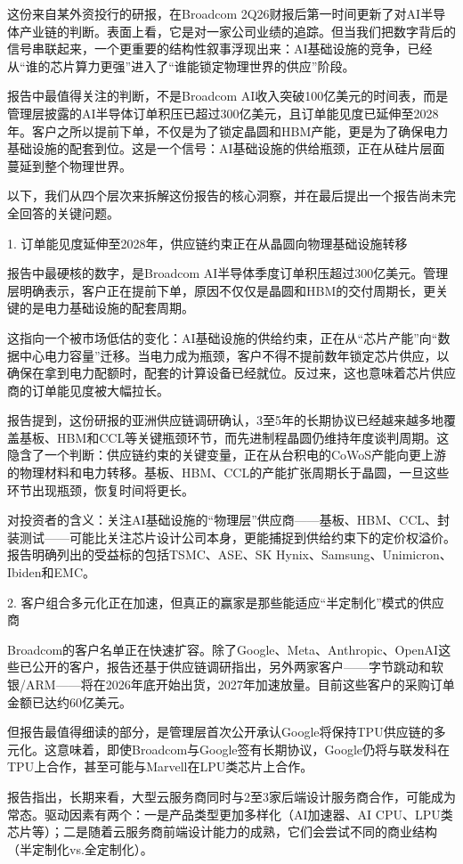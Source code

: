 \documentclass[11pt]{ctexart}
\begin{document}
这份来自某外资投行的研报，在Broadcom 2Q26财报后第一时间更新了对AI半导体产业链的判断。表面上看，它是对一家公司业绩的追踪。但当我们把数字背后的信号串联起来，一个更重要的结构性叙事浮现出来：AI基础设施的竞争，已经从“谁的芯片算力更强”进入了“谁能锁定物理世界的供应”阶段。

报告中最值得关注的判断，不是Broadcom AI收入突破100亿美元的时间表，而是管理层披露的AI半导体订单积压已超过300亿美元，且订单能见度已延伸至2028年。客户之所以提前下单，不仅是为了锁定晶圆和HBM产能，更是为了确保电力基础设施的配套到位。这是一个信号：AI基础设施的供给瓶颈，正在从硅片层面蔓延到整个物理世界。

以下，我们从四个层次来拆解这份报告的核心洞察，并在最后提出一个报告尚未完全回答的关键问题。

1. 订单能见度延伸至2028年，供应链约束正在从晶圆向物理基础设施转移

报告中最硬核的数字，是Broadcom AI半导体季度订单积压超过300亿美元。管理层明确表示，客户正在提前下单，原因不仅仅是晶圆和HBM的交付周期长，更关键的是电力基础设施的配套周期。

这指向一个被市场低估的变化：AI基础设施的供给约束，正在从“芯片产能”向“数据中心电力容量”迁移。当电力成为瓶颈，客户不得不提前数年锁定芯片供应，以确保在拿到电力配额时，配套的计算设备已经就位。反过来，这也意味着芯片供应商的订单能见度被大幅拉长。

报告提到，这份研报的亚洲供应链调研确认，3至5年的长期协议已经越来越多地覆盖基板、HBM和CCL等关键瓶颈环节，而先进制程晶圆仍维持年度谈判周期。这隐含了一个判断：供应链约束的关键变量，正在从台积电的CoWoS产能向更上游的物理材料和电力转移。基板、HBM、CCL的产能扩张周期长于晶圆，一旦这些环节出现瓶颈，恢复时间将更长。

对投资者的含义：关注AI基础设施的“物理层”供应商——基板、HBM、CCL、封装测试——可能比关注芯片设计公司本身，更能捕捉到供给约束下的定价权溢价。报告明确列出的受益标的包括TSMC、ASE、SK Hynix、Samsung、Unimicron、Ibiden和EMC。

2. 客户组合多元化正在加速，但真正的赢家是那些能适应“半定制化”模式的供应商

Broadcom的客户名单正在快速扩容。除了Google、Meta、Anthropic、OpenAI这些已公开的客户，报告还基于供应链调研指出，另外两家客户——字节跳动和软银/ARM——将在2026年底开始出货，2027年加速放量。目前这些客户的采购订单金额已达约60亿美元。

但报告最值得细读的部分，是管理层首次公开承认Google将保持TPU供应链的多元化。这意味着，即使Broadcom与Google签有长期协议，Google仍将与联发科在TPU上合作，甚至可能与Marvell在LPU类芯片上合作。

报告指出，长期来看，大型云服务商同时与2至3家后端设计服务商合作，可能成为常态。驱动因素有两个：一是产品类型更加多样化（AI加速器、AI CPU、LPU类芯片等）；二是随着云服务商前端设计能力的成熟，它们会尝试不同的商业结构（半定制化vs.全定制化）。
\end{document}
